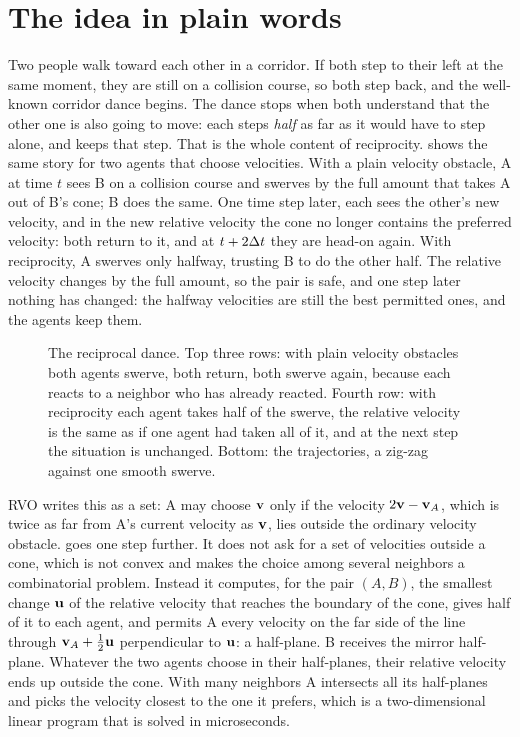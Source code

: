 \section{The idea in plain words}
\label{sec:ch13-intuition}

Two people walk toward each other in a corridor. If both step to their left
at the same moment, they are still on a collision course, so both step back,
and the well-known corridor dance begins. The dance stops when both understand
that the other one is also going to move: each steps \emph{half} as far as it
would have to step alone, and keeps that step. That is the whole content of
reciprocity.  shows the same story for two agents that
choose velocities. With a plain velocity obstacle, A at time $t$ sees B on a
collision course and swerves by the full amount that takes A out of B's cone;
B does the same. One time step later, each sees the other's new velocity, and
in the new relative velocity the cone no longer contains the preferred
velocity: both return to it, and at $t + 2\Delta t$ they are head-on again. With
reciprocity, A swerves only halfway, trusting B to do the other half. The
relative velocity changes by the full amount, so the pair is safe, and one
step later nothing has changed: the halfway velocities are still the best
permitted ones, and the agents keep them.

\begin{figure}[tb]
  \centering
  \caption{The reciprocal dance. Top three rows: with plain velocity
  obstacles both agents swerve, both return, both swerve again, because each
  reacts to a neighbor who has already reacted. Fourth row: with reciprocity
  each agent takes half of the swerve, the relative velocity is the same as
  if one agent had taken all of it, and at the next step the situation is
  unchanged. Bottom: the trajectories, a zig-zag against one smooth swerve.}
  \label{fig:ch13-idea}
\end{figure}

RVO writes this as a set: A may choose $\mathbf{v}$ only if the velocity
$2\mathbf{v} - \mathbf{v}_A$, which is twice as far from A's current velocity as $\mathbf{v}$,
lies outside the ordinary velocity obstacle. \orca goes one step further. It
does not ask for a set of velocities outside a cone, which is not convex and
makes the choice among several neighbors a combinatorial problem. Instead it
computes, for the pair $(A, B)$, the smallest change $\mathbf{u}$ of the
relative velocity that reaches the boundary of the cone, gives half of it to
each agent, and permits A every velocity on the far side of the line through
$\mathbf{v}_A + \tfrac12\mathbf{u}$ perpendicular to $\mathbf{u}$: a half-plane. B
receives the mirror half-plane. Whatever the two agents choose in their
half-planes, their relative velocity ends up outside the cone. With many
neighbors A intersects all its half-planes and picks the velocity closest to
the one it prefers, which is a two-dimensional linear program that is solved
in microseconds.

